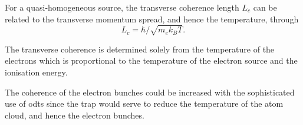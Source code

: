 For a quasi-homogeneous source\cite{nugent_coherent_2009}, the transverse coherence length $L_c$ can be related to the transverse momentum spread, and hence the temperature, through\cite{van_oudheusden_electron_2007}
\begin{equation}
L_c = \hbar/\sqrt{m_e k_B T}.
\end{equation}

The transverse coherence is determined solely from the temperature of the electrons which is proportional to the temperature of the electron source and the ionisation energy.

The coherence of the electron bunches could be increased with the sophisticated use of \glspl{odt} since the trap would serve to reduce the temperature of the atom cloud, and hence the electron bunches.
